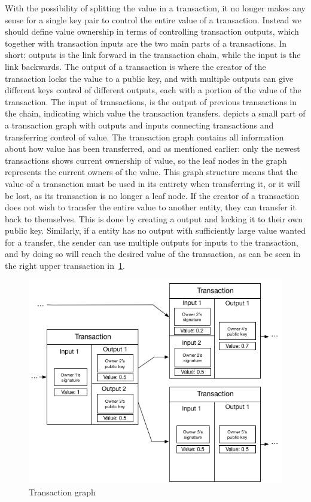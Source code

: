 With the possibility of splitting the value in a transaction, it no longer makes any sense for a single key pair to control the entire value of a transaction. Instead we should define value ownership in terms of controlling transaction outputs, which together with transaction inputs are the two main parts of a transactions. In short: outputs is the link forward in the transaction chain, while the input is the link backwards. The output of a transaction is where the creator of the transaction locks the value to a public key, and with multiple outputs can give different keys control of different outputs, each with a portion of the value of the transaction. The input of transactions, is the output of previous transactions in the chain, indicating which value the transaction transfers.  depicts a small part of a transaction graph with outputs and inputs connecting transactions and transferring control of value. The transaction graph contains all information about how value has been transferred, and as mentioned earlier: only the newest transactions shows current ownership of value, so the leaf nodes in the graph represents the current owners of the value.
This graph structure means that the value of a transaction must be used in its entirety when transferring it, or it will be lost, as its transaction is no longer a leaf node. If the creator of a transaction does not wish to transfer the entire value to another entity, they can transfer it back to themselves. This is done by creating a output and locking it to their own public key. Similarly, if a entity has no output with sufficiently large value wanted for a transfer, the sender can use multiple outputs for inputs to the transaction, and by doing so will reach the desired value of the transaction, as can be seen in the right upper transaction in~\cref{fig:transaction_graph}.


\begin{figure}[h]  %
  \centering
  \includegraphics[width=.7\textwidth]{figures/transaction}
  \caption[Transaction chain]{Transaction graph}
  \label{fig:transaction_graph}
\end{figure}


